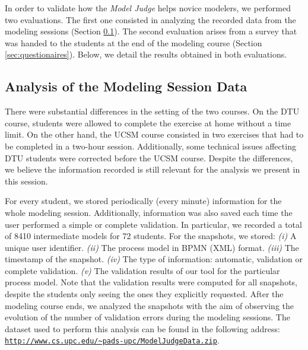 In order to validate how the \textit{Model Judge} helps novice modelers, we performed two evaluations.  The first one consisted in analyzing the recorded data from the modeling sessions (Section \ref{sec:data_analysis}). The second evaluation arises from a survey that was handed to the students at the end of the modeling course (Section \ref{sec:questionaires}). Below, we detail the results obtained in both evaluations.

\subsection{Analysis of the Modeling Session Data}
\label{sec:data_analysis}
There were substantial differences in the setting of the two courses. On the DTU course, students were allowed to complete the exercise at home without a time limit. On the other hand, the UCSM course consisted in two exercises that had to be completed in a two-hour session.
Additionally, some technical issues affecting DTU students were corrected before the UCSM course. Despite the differences, we believe the information recorded is still relevant for the analysis we present in this session. 

For every student, we stored periodically (every minute) information for the whole modeling session. Additionally, information was also saved each time the user performed a simple or complete validation. In particular, we recorded a total of 8410 intermediate models for 72 students. For the snapshots, we stored: \textit{(i)} A unique user identifier. \textit{(ii)} The process model in BPMN (XML) format. \textit{(iii)} The timestamp of the snapshot. \textit{(iv)} The type of information: automatic, validation or complete validation. \textit{(v)} The validation results of our tool for the particular process model. Note that the validation results were computed for all snapshots, despite the students only seeing the ones they explicitly requested. 
After the modeling course ends, we analyzed the snapshots with the aim of observing the evolution of the number of validation errors during the modeling sessions. The dataset used to perform this analysis can be found in the following address: \texttt{\url{http://www.cs.upc.edu/~pads-upc/ModelJudgeData.zip}}.

